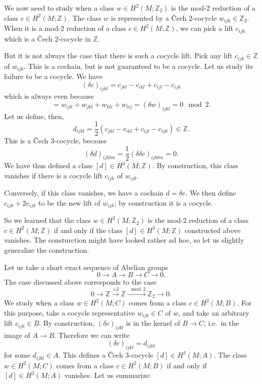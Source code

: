 \documentclass[12pt]{article}
\numberwithin{equation}{section}
\theoremstyle{remark}
\def\bZ{\mathbb{Z}}
\begin{document}
We now need to study when a class $w\in H^2(M;\bZ_2)$ is the mod-2 reduction of a class $c\in H^2(M;\bZ)$.
The class $w$ is represented by a \v Cech 2-cocycle $w_{ijk}\in \bZ_2$.
When it is a mod-2 reduction of a class $c\in H^2(M;\bZ)$,
we can pick a lift $c_{ijk}$ which is a \v Cech 2-cocycle in $\bZ$.

But it is not always the case that there is such a cocycle lift.
Pick any lift $c_{ijk}\in \bZ$ of $w_{ijk}$.
This is a cochain, but is not guaranteed to be a cocycle.
Let us study its failure to be a cocycle.
We have \begin{equation}
(\delta c)_{ijkl} = c_{jkl}-c_{ikl}+c_{ijl}-c_{ijk} 
\end{equation} which is always even because \begin{equation}
  = w_{ijk}+w_{jkl}+w_{kli}+w_{lij} = (\delta w)_{ijkl}=0\mod 2.
\end{equation}
Let us define, then, \begin{equation}
  d_{ijkl} = \frac12(c_{jkl}-c_{ikl}+c_{ijl}-c_{ijk})\in \bZ.
\end{equation}
This is a \v Cech 3-cocycle, because \begin{equation}
(\delta d)_{ijklm} = \frac12 (\delta\delta c)_{ijklm} =0.
\end{equation}
We have thus defined a class $[d]\in H^3(M;\bZ)$.
By construction, this class vanishes if there is a cocycle lift $c_{ijk}$ of $w_{ijk}$.

Conversely, if this class vanishes, we have a cochain $d=\delta e$.
We then define $c_{ijk}+2e_{ijk}$ to be the new lift of $w_{ijk}$;
by construction it is a cocycle.

So we learned that the class $w\in H^2(M;\bZ_2)$ is the mod-2 reduction of a class $c\in H^2(M;\bZ)$ 
if and only if the class $[d]\in H^3(M;\bZ)$ constructed above vanishes.
The consturction might have looked rather ad hoc, 
so let us slightly generalize the construction.

Let us take a short exact sequence of Abelian groups \begin{equation}
  0\to A\to B\to C\to 0.
\end{equation}
The case discussed above corresponds to the case \begin{equation}
  0\to \bZ\xrightarrow{\times2} \bZ\xrightarrow{\mod2} \bZ_2\to 0.
\end{equation}
We study when a class $w\in H^2(M;C)$ comes from a class $c\in H^2(M;B)$.
For this purpose, take a cocycle representative $w_{ijk}\in C$ of $w$,
and take an arbitrary lift $c_{ijk}\in B$.
By construction, $(\delta c)_{ijkl}$ is in the kernel of $B\to C$,
i.e.~in the image of $A\to B$.
Therefore we can write \begin{equation}
  (\delta c)_{ijkl} = d_{ijkl}
\end{equation} for some $d_{ijkl}\in A$.
This defines a \v Cech 3-cocycle $[d]\in H^3(M;A)$.
The class $w\in H^2(M;C)$ comes from a class $c\in H^2(M;B)$ if and only if $[d]\in H^3(M;A)$ vanishes.
Let us summarize:
\end{document}
